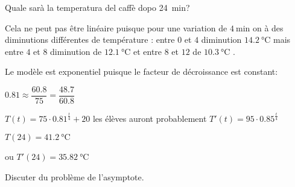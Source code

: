 \begin{questions}
{		Quale sarà la temperatura del caffè dopo \SI{24}{\minute}?
	}



	\begin{profonly}
		Cela ne peut pas être linéaire puisque pour une variation de  $\SI{4}{\minute}$ on à des diminutions différentes de température : entre $0$ et $4$ diminution $\SI{14.2}{\degreeCelsius}$ mais entre $4$ et $8$ diminution de $\SI{12.1}{\degreeCelsius}$  et entre $8$ et $12$ de $\SI{10.3}{\degreeCelsius}$ .

		Le modèle est exponentiel puisque le facteur de décroissance est constant:

		$0.81 \approx \dfrac{60.8}{75}=\dfrac{48.7}{60.8}$

		$T(t)= 75 \cdot 0.81^\frac{t}{4}+20$  les élèves auront probablement $T'(t)=95 \cdot 0.85^\frac{t}{4}$

		$T(24)=\SI{41.2}{\degreeCelsius}$

		ou $T'(24)=\SI{35.82}{\degreeCelsius}$

		Discuter du problème de l'asymptote.
	\end{profonly}

	\exnewpage
	\question



	\question
\end{questions}

